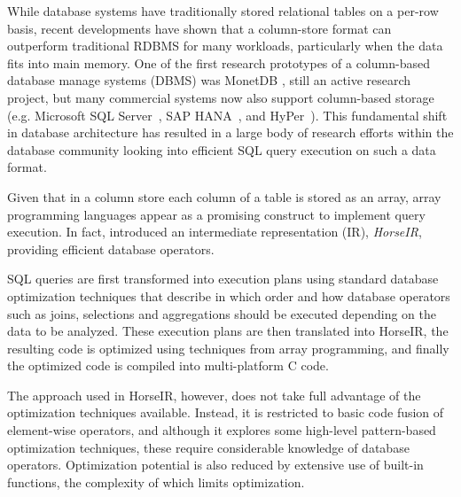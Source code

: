 While database systems have traditionally stored relational tables on a per-row
basis, recent developments have shown that a column-store format can outperform
traditional RDBMS for many workloads, particularly when the data fits into
main memory.
One of the first research prototypes of a column-based database manage systems
(DBMS) was MonetDB \cite{IdreosS2012}, still an active research project, but
many commercial systems now also support column-based storage (e.g.
Microsoft SQL Server~\cite{msqlserver},
SAP HANA~\cite{FarberF2012}, and
HyPer~\cite{Neumann2011:HyPer}).
This fundamental shift in database architecture has resulted in a large body of
research efforts within the database community looking into efficient SQL query
execution on such a data format.

Given that in a column store each column of a table is stored as an array,
array programming languages appear as a promising construct to implement query
execution. In fact, \OldPaperAuthor introduced an intermediate representation (IR),
\textit{HorseIR}, providing efficient database operators.

SQL queries are first transformed into execution plans using standard database
optimization techniques that describe in which order and how database operators
such as joins, selections and aggregations should be executed depending on the
data to be analyzed. These execution plans are then translated into HorseIR,
the resulting code is optimized using techniques from array programming, and
finally the optimized code is compiled into multi-platform C code.

The approach used in HorseIR, however, does not take full advantage of the
optimization techniques available. Instead, it is restricted to basic code
fusion of element-wise operators, and although it explores some high-level
pattern-based optimization techniques, these require considerable knowledge of
database operators.  Optimization potential is also reduced by extensive use of
built-in functions, the complexity of which limits optimization.

